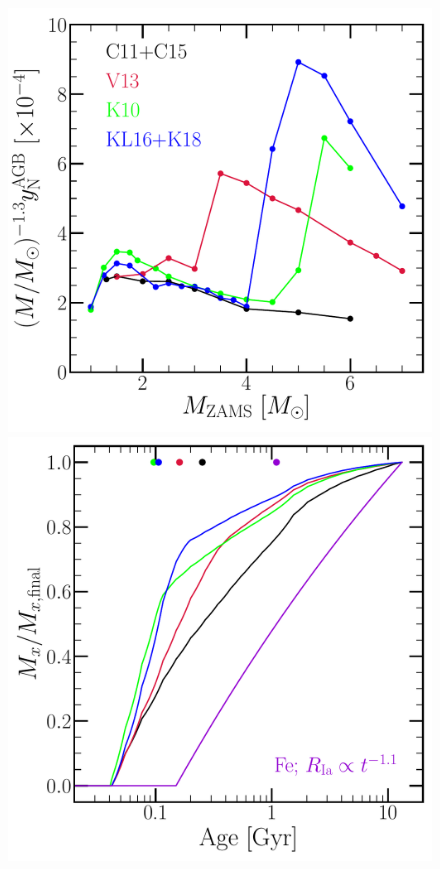 \documentclass[ms.tex]{subfiles}
\begin{document}
\begin{figure}
\centering
\includegraphics[scale = 0.32]{agb_yield_models_imfweighted.pdf}
\includegraphics[scale = 0.32]{ssp_production_modelcomp.pdf}

\end{figure}
\end{document}
